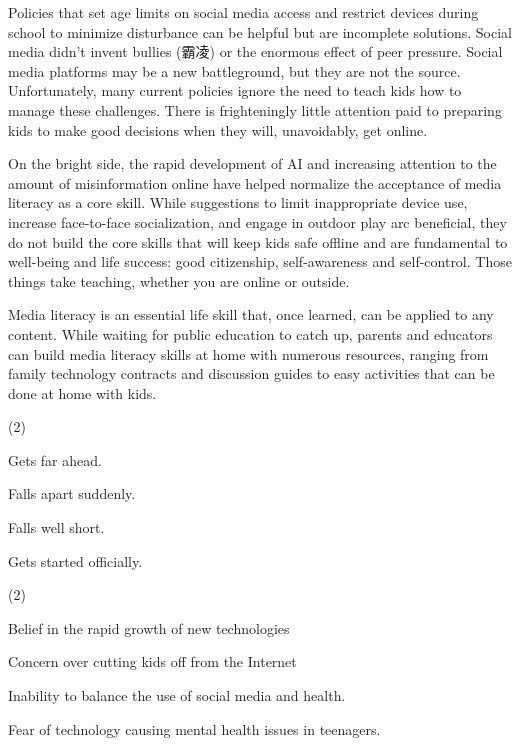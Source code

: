 \documentclass{英语试卷}
\begin{document}
\par Policies that set age limits on social media access and restrict devices during school to minimize disturbance can be helpful but are incomplete solutions. Social media didn't invent bullies (霸凌) or the enormous effect of peer pressure. Social media platforms may be a new battleground, but they are not the source. Unfortunately, many current policies ignore the need to teach kids how to manage these challenges. There is frighteningly little attention paid to preparing kids to make good decisions when they will, unavoidably, get online.\par
\par On the bright side, the rapid development of AI and increasing attention to the amount of misinformation online have helped normalize the acceptance of media literacy as a core skill. While suggestions to limit inappropriate device use, increase face-to-face socialization, and engage in outdoor play arc beneficial, they do not build the core skills that will keep kids safe offline and are fundamental to well-being and life success: good citizenship, self-awareness and self-control. Those things take teaching, whether you are online or outside.\par
\par Media literacy is an essential life skill that, once learned, can be applied to any content. While waiting for public education to catch up, parents and educators can build media literacy skills at home with numerous resources, ranging from family technology contracts and discussion guides to easy activities that can be done at home with kids.\par
{}
\begin{choices}(2)
  \item Gets far ahead.
  \item Falls apart suddenly.
  \item Falls well short.
  \item Gets started officially.
\end{choices}
\begin{choices}(2)
  \item Belief in the rapid growth of new technologies
  \item Concern over cutting kids off from the Internet
  \item Inability to balance the use of social media and health.
  \item Fear of technology causing mental health issues in teenagers.
\end{choices}
\end{document}
